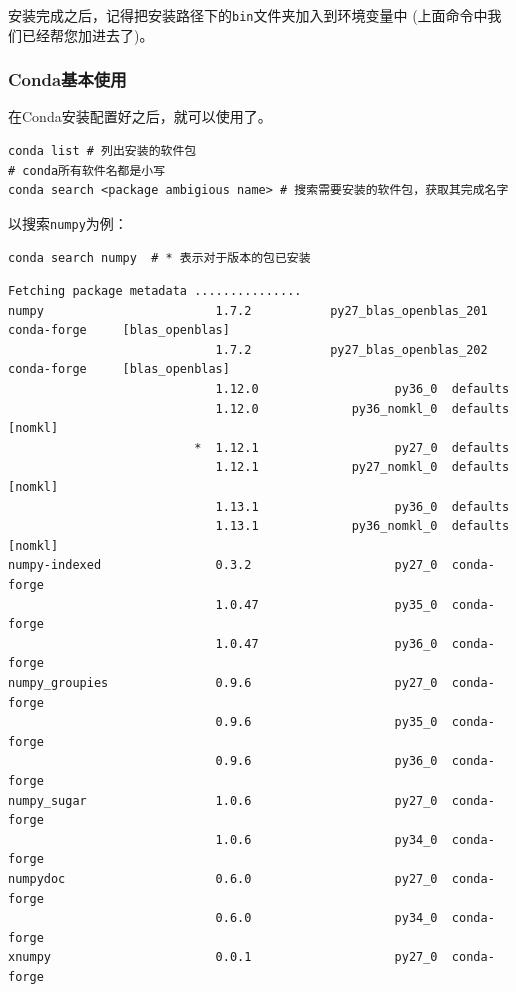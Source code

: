\documentclass[]{article}
\numberwithin{figure}{section}
\numberwithin{table}{section}
\begin{document}
安装完成之后，记得把安装路径下的\texttt{bin}文件夹加入到环境变量中 (上面命令中我们已经帮您加进去了)。

\hypertarget{conda_basic}{%
\subsubsection{Conda基本使用}\label{conda_basic}}

在Conda安装配置好之后，就可以使用了。

\begin{verbatim}
conda list # 列出安装的软件包
# conda所有软件名都是小写
conda search <package ambigious name> # 搜索需要安装的软件包，获取其完成名字
\end{verbatim}

以搜索\texttt{numpy}为例：

\begin{verbatim}
conda search numpy  # * 表示对于版本的包已安装
\end{verbatim}

\begin{verbatim}
Fetching package metadata ...............
numpy                        1.7.2           py27_blas_openblas_201  conda-forge     [blas_openblas]
                             1.7.2           py27_blas_openblas_202  conda-forge     [blas_openblas]
                             1.12.0                   py36_0  defaults        
                             1.12.0             py36_nomkl_0  defaults        [nomkl]
                          *  1.12.1                   py27_0  defaults        
                             1.12.1             py27_nomkl_0  defaults        [nomkl]
                             1.13.1                   py36_0  defaults        
                             1.13.1             py36_nomkl_0  defaults        [nomkl]
numpy-indexed                0.3.2                    py27_0  conda-forge                
                             1.0.47                   py35_0  conda-forge     
                             1.0.47                   py36_0  conda-forge     
numpy_groupies               0.9.6                    py27_0  conda-forge     
                             0.9.6                    py35_0  conda-forge     
                             0.9.6                    py36_0  conda-forge     
numpy_sugar                  1.0.6                    py27_0  conda-forge     
                             1.0.6                    py34_0  conda-forge        
numpydoc                     0.6.0                    py27_0  conda-forge     
                             0.6.0                    py34_0  conda-forge             
xnumpy                       0.0.1                    py27_0  conda-forge           
\end{verbatim}
\end{document}
